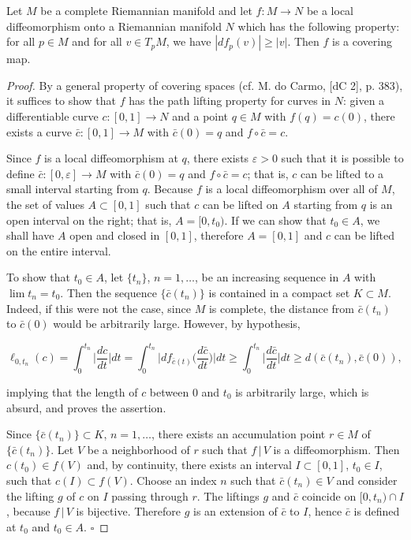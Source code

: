 \begin{lemma}
  \label{lem:dc-ch7-3-3}
  Let $M$ be a complete Riemannian manifold and let $f:M\to N$ be a local
  diffeomorphism onto a Riemannian manifold $N$ which has the following property:
  for all $p\in M$ and for all $v\in T_pM$, we have $|df_p(v)|\ge|v|$. Then $f$ is a
  covering map.
\end{lemma}
\begin{proof}
  By a general property of covering spaces (cf. M. do Carmo, [dC 2],
  p. 383), it suffices to show that $f$ has the path lifting property for curves in
  $N$: given a differentiable curve $c:[0,1]\to N$ and a point $q\in M$ with
  $f(q)=c(0)$, there exists a curve $\bar c:[0,1]\to M$ with $\bar c(0)=q$ and
  $f\circ\bar c=c$.
  
  Since $f$ is a local diffeomorphism at $q$, there exists $\varepsilon>0$ such that
  it is possible to define $\bar c:[0,\varepsilon]\to M$ with $\bar c(0)=q$ and
  $f\circ\bar c=c$; that is, $c$ can be lifted to a small interval starting from $q$.
  Because $f$ is a local diffeomorphism over all of $M$, the set of values
  $A\subset[0,1]$ such that $c$ can be lifted on $A$ starting from $q$ is an open
  interval on the right; that is, $A=[0,t_0)$. If we can show that $t_0\in A$, we
  shall have $A$ open and closed in $[0,1]$, therefore $A=[0,1]$ and $c$ can be
  lifted on the entire interval.
  
  To show that $t_0\in A$, let $\{t_n\}$, $n=1,\dots$, be an increasing sequence in
  $A$ with $\lim t_n=t_0$. Then the sequence $\{\bar c(t_n)\}$ is contained in a
  compact set $K\subset M$. Indeed, if this were not the case, since $M$ is
  complete, the distance from $\bar c(t_n)$ to $\bar c(0)$ would be arbitrarily
  large. However, by hypothesis,
  
  $$
  \ell_{0,t_n}(c)=\int_0^{t_n}\Big|\frac{dc}{dt}\Big|dt=\int_0^{t_n}\Big|df_{\bar c(t)}\Big(\frac{d\bar c}{dt}\Big)\Big|dt\ge\int_0^{t_n}\Big|\frac{d\bar c}{dt}\Big|dt\ge d(\bar c(t_n),\bar c(0)),
  $$
  
  implying that the length of $c$ between $0$ and $t_0$ is arbitrarily large, which
  is absurd, and proves the assertion.
  
  Since $\{\bar c(t_n)\}\subset K$, $n=1,\dots$, there exists an accumulation point
  $r\in M$ of $\{\bar c(t_n)\}$. Let $V$ be a neighborhood of $r$ such that $f\,|\,V$
  is a diffeomorphism. Then $c(t_0)\in f(V)$ and, by continuity, there exists an
  interval $I\subset[0,1]$, $t_0\in I$, such that $c(I)\subset f(V)$. Choose an
  index $n$ such that $\bar c(t_n)\in V$ and consider the lifting $g$ of $c$ on $I$
  passing through $r$. The liftings $g$ and $\bar c$ coincide on $[0,t_n)\cap I$,
  because $f\,|\,V$ is bijective. Therefore $g$ is an extension of $\bar c$ to $I$,
  hence $\bar c$ is defined at $t_0$ and $t_0\in A$. $\square$
\end{proof}

